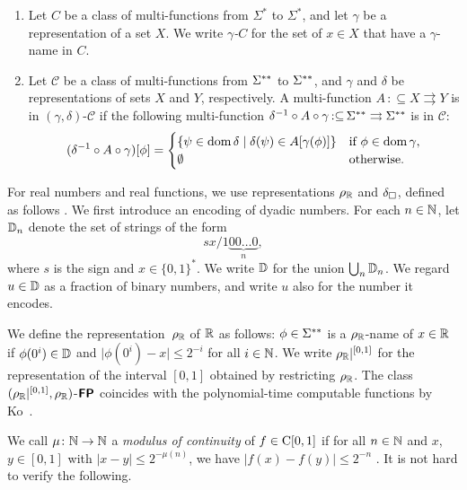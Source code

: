 \documentclass[envcountsect,envcountsame,orivec,oribibl]{llncs}
\newcommand{\pcolon}{\mathpunct{\,:\subseteq}}
\begin{document}
\begin{definition}
\label{definition: computation wrt representation}
\begin{enumerate}
\item 
Let $C$ be a class of multi-functions from $\Sigma ^*$ to $\Sigma ^*$, 
and let $\gamma$ be a representation of a set $X$. 
We write \emph{$\gamma$-$C$} for the set of $x \in X$
that have a $\gamma$-name in $C$.
\item 
Let $\mathcal C$ be a class of multi-functions from $\Sigma ^{**}$ to $\Sigma ^{**}$,
and $\gamma$ and $\delta$ be representations of sets $X$ and $Y$, respectively.
A multi-function $A \pcolon X \rightrightarrows Y$
is in $(\gamma, \delta)$-$\mathcal C$ if 
the following multi-function $
\delta^{-1} \circ A \circ \gamma \pcolon \LM \rightrightarrows \LM
$ is in $\mathcal C$: 
\begin{equation}
 (\delta^{-1} \circ A \circ \gamma)[\phi] = 
  \begin{cases}
   \{\psi \in \mathop{\rm dom} \delta \mid \delta(\psi) \in A[\gamma(\phi)] \}
   & 
   \text{if } \phi \in \mathop{\rm dom} \gamma, 
   \\ 
   \emptyset 
   &
   \text{otherwise.}
  \end{cases}
\end{equation}
\end{enumerate}
\end{definition}

For real numbers and real functions,
we use representations $\rho _\mathbb R$ and $\delta _\square$, 
defined as follows \cite{kawamura2012complexity}. 
We first introduce an encoding of dyadic numbers.
For each $n \in \mathbb N$, let $\mathbb D_n$ denote the set of strings of the form
\begin{equation}
 sx/1\!\underbrace{00\dots0}_{n},
\end{equation}
where $s$ is the sign and $x \in \{0,1\}^*$.
We write $\mathbb D$ for the union $\bigcup _n \mathbb D _n$.
We regard $u \in \mathbb D$ as a fraction of binary numbers, 
and write $u$ also for the number it encodes. 

We define the representation~$\rho _\mathbb R$ of $\mathbb R$ as follows: 
$\phi \in \Sigma ^{**}$ is a $\rho _\mathbb R$-name of $x \in \mathbb R$ 
if $\phi(0^i) \in \mathbb D$ and $\lvert \phi(0^i) - x \rvert \le 2^{-i}$
for all $i \in \mathbb N$.
We write $\rho _\mathbb R|^{[0,1]}$ for the representation of the interval $[0, 1]$ 
obtained by restricting $\rho _\mathbb R$.
The class $(\rho _\mathbb R|^{[0,1]},\rho _\mathbb R)$-$\text{\bfseries \sffamily \upshape FP}$ 
coincides with 
the polynomial-time computable functions by Ko~\cite{ko1991complexity}. 

We call $\mu \colon \mathbb N \to \mathbb N$ a {\em modulus of continuity} 
of $f \in \mathrm C [0, 1]$ 
if 
for all $n \in \mathbb N$ and $x$, $y \in [0,1]$ with
$|x - y| \le 2^{-\mu(n)}$, 
we have $|f(x) - f(y)| \le 2^{-n}$ .
It is not hard to verify the following. 
\end{document}
